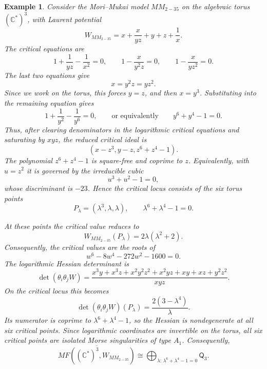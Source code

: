 \documentclass[11pt]{amsart}
\newtheorem{example}{Example}[section]
\newcommand{\MorseCat}[1]{\mathsf{Q}_{#1}}
\begin{document}
\begin{example}
Consider the Mori--Mukai model $MM_{2-35}$ on the algebraic torus
$(\mathbb{C}^*)^3$, with Laurent potential
\[
W_{MM_{2-35}}=x+\frac{x}{yz}+y+z+\frac{1}{x}.
\]
The critical equations are
\[
1+\frac{1}{yz}-\frac{1}{x^2}=0,
\qquad
1-\frac{x}{y^2z}=0,
\qquad
1-\frac{x}{yz^2}=0.
\]
The last two equations give
\[
x=y^2z=yz^2.
\]
Since we work on the torus, this forces $y=z$, and then $x=y^3$. Substituting
into the remaining equation gives
\[
1+\frac{1}{y^2}-\frac{1}{y^6}=0,
\qquad\text{or equivalently}\qquad
y^6+y^4-1=0.
\]
Thus, after clearing denominators in the logarithmic critical equations and
saturating by $xyz$, the reduced critical ideal is
\[
\left(
x-z^3,
y-z,
z^6+z^4-1
\right).
\]
The polynomial $z^6+z^4-1$ is square-free and coprime to $z$. Equivalently,
with $u=z^2$ it is governed by the irreducible cubic
\[
u^3+u^2-1=0,
\]
whose discriminant is $-23$. Hence the critical locus consists of the six
torus points
\[
P_{\lambda}=(\lambda^3,\lambda,\lambda),
\qquad
\lambda^6+\lambda^4-1=0.
\]

At these points the critical value reduces to
\[
W_{MM_{2-35}}(P_{\lambda})
=2\lambda(\lambda^2+2).
\]
Consequently, the critical values are the roots of
\[
w^6-8w^4-272w^2-1600=0.
\]
The logarithmic Hessian determinant is
\[
\det(\theta_i\theta_jW)
=\frac{x^3y+x^3z+x^2y^2z^2+x^2yz+xy+xz+y^2z^2}{xyz}.
\]
On the critical locus this becomes
\[
\det(\theta_i\theta_jW)(P_{\lambda})
=\frac{2(3-\lambda^4)}{\lambda}.
\]
Its numerator is coprime to $\lambda^6+\lambda^4-1$, so the Hessian is
nondegenerate at all six critical points. Since logarithmic coordinates are
invertible on the torus, all six critical points are isolated Morse
singularities of type $A_1$. Consequently,
\[
\overline{MF((\mathbb{C}^*)^3,W_{MM_{2-35}})}
\cong \bigoplus_{\lambda:\,\lambda^6+\lambda^4-1=0}\MorseCat{3}.
\]
\end{example}
\end{document}
